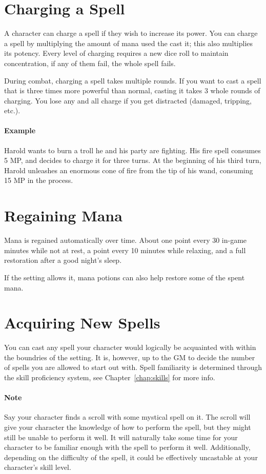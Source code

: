 \section{Charging a Spell}
A character can charge a spell if they wish to increase its power.
You can charge a spell by multiplying the amount of mana used the cast it;
this also multiplies its potency.
Every level of charging requires a new dice roll to maintain concentration, if any of them fail, the whole spell fails.

During combat, charging a spell takes multiple rounds.
If you want to cast a spell that is three times more powerful than normal, casting it takes 3 whole rounds of charging.
You lose any and all charge if you get distracted (damaged, tripping, etc.).

\paragraph{Example} Harold wants to burn a troll he and his party are fighting.
His fire spell consumes 5 MP, and decides to charge it for three turns.
At the beginning of his third turn, Harold unleashes an enormous cone of fire from the tip of his wand, consuming 15 MP in the process.

\section{Regaining Mana}
Mana is regained automatically over time.
About one point every 30 in-game minutes while not at rest,
a point every 10 minutes while relaxing,
and a full restoration after a good night's sleep.

If the setting allows it, mana potions can also help restore some of the spent mana.

\section{Acquiring New Spells}
You can cast any spell your character would logically be acquainted with within the boundries of the setting.
It is, however, up to the GM to decide the number of spells you are allowed to start out with.
Spell familiarity is determined through the skill proficiency system, see Chapter~\ref{chap:skills} for more info.

\paragraph{Note} Say your character finds a scroll with some mystical spell on it.
The scroll will give your character the knowledge of how to perform the spell, but they might still be unable to perform it well.
It will naturally take some time for your character to be familiar enough with the spell to perform it well.
Additionally, depending on the difficulty of the spell, it could be effectively uncastable at your character's skill level.
